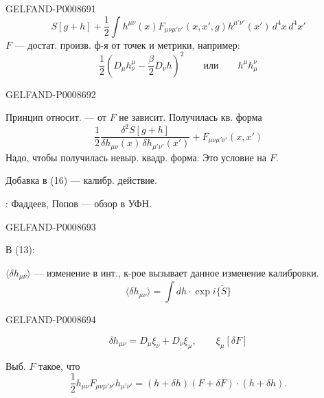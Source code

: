 \begin{GelfandAdjacentEvidence}{GELFAND-P000869}{1}
\begin{equation*}
S[g+h]+\frac12\int h^{\mu\nu}(x)
F_{\mu\nu\mu'\nu'}(x,x',g)h^{\mu'\nu'}(x')\,d^4x\,d^4x'
\tag{16}
\end{equation*}
$F$ --- достат. произв. ф-я от точек и метрики, например:
\begin{equation*}
\frac12\left(D_\mu h^\mu_\nu-\frac\beta2D_\nu h\right)^2
\qquad\text{или}\qquad h^\mu h_\mu^\nu
\tag{17}
\end{equation*}
\end{GelfandAdjacentEvidence}
\begin{GelfandAdjacentEvidence}{GELFAND-P000869}{2}


Принцип относит. --- от $F$ не зависит. Получилась кв. форма
\begin{equation*}
\frac12\frac{\delta^2S[g+h]}{\delta h_{\mu\nu}(x)\,\delta h_{\mu'\nu'}(x')}
+F_{\mu\nu\mu'\nu'}(x,x')
\tag{18}
\end{equation*}
Надо, чтобы получилась невыр. квадр. форма. Это условие на $F$.

Добавка в (16) --- калибр. действие.

: Фаддеев, Попов --- обзор в УФН.

\end{GelfandAdjacentEvidence}
\begin{GelfandAdjacentEvidence}{GELFAND-P000869}{3}

В (13):

$\langle\delta h_{\mu\nu}\rangle$ --- изменение в инт., к-рое вызывает данное изменение калибровки.
\[
\langle\delta h_{\mu\nu}\rangle=\int dh\cdot\exp i\{\widetilde S\}
\]
\end{GelfandAdjacentEvidence}
\begin{GelfandAdjacentEvidence}{GELFAND-P000869}{4}

\begin{equation*}
\delta h_{\mu\nu}=D_\mu\xi_\nu+D_\nu\xi_\mu,\qquad
\xi_\mu[\delta F]
\tag{19}
\end{equation*}

Выб. $F$ такое, что
\begin{equation*}
\frac12h_{\mu\nu}F_{\mu\nu\mu'\nu'}h_{\mu'\nu'}
=(h+\delta h)(F+\delta F)\cdot(h+\delta h).
\tag{20}
\end{equation*}
\end{GelfandAdjacentEvidence}
